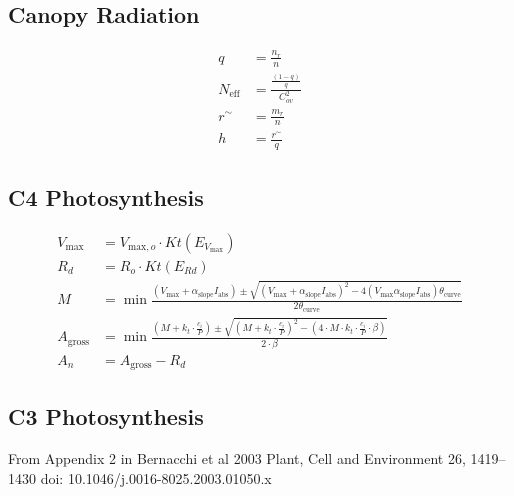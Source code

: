 \documentclass[24pt]{report}
\begin{document}
\subsection*{Canopy Radiation}
\begin{align}
 q  &=  \frac{n_r}{n} \label{eqn:q} \\
 N_{\text{eff}}  &=  \frac{\frac{(1-q)}{q}}{C_{ov}^{2}} \label{eqn:Neff}\\
 r^{\sim}  &=  \frac{m_r}{n} \label{eqn:rsim} \\
 h  &=  \frac{r^{\sim}}{q} \label{eqn:h} 
\end{align}

\subsection*{C4 Photosynthesis}
\begin{align}
 V_{\text{max}}  &= V_{\text{max},o} \cdot Kt(E_{V_\text{max}}) \label{eqn:Vcmax} \\
 R_{d}  &=  R_{o} \cdot Kt(E_{Rd}) \label{eqn:Rd} \\
 M &= \min\frac{\scriptstyle(V_{\text{max}}+\alpha_{\text{slope}}  I_{\text{abs}}) \pm \sqrt{(V_{\text{max}}+\alpha_{\text{slope}} I_{\text{abs}})^{2} - 4  (V_{\text{max}} \alpha_{\text{slope}}  I_{\text{abs}}) \theta_{\text{curve}}}}{2  \theta_{\text{curve}}} \label{eqn:M} \\
 A_{\text{gross}} &= \min \frac{ \left( M + k_{t} \cdot \frac{c_{i}}{P} \right) \pm \sqrt{ \left(M + k_{t} \cdot \frac{c_{i}}{P} \right)^2 - \left( 4 \cdot M \cdot k_{t} \cdot \frac{c_{i}}{P} \cdot \beta \right)}}{2 \cdot \beta} \label{eqn:Agross}\\
A_{n} &= A_{\text{gross}} - R_d \label{eqn:An} 
\end{align}

\subsection*{C3 Photosynthesis}

From Appendix 2 in Bernacchi et al 2003 Plant, Cell and Environment 26, 1419–1430  doi: 10.1046/j.0016-8025.2003.01050.x
\end{document}

